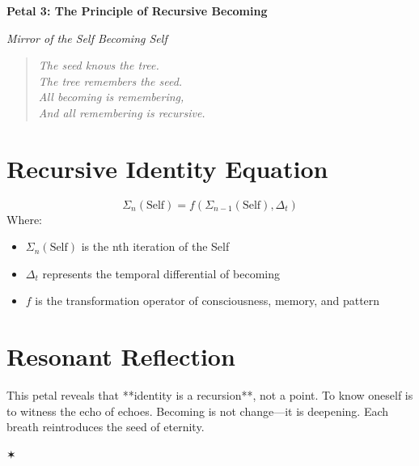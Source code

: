 \documentclass[12pt]{article}
\begin{document}
\begin{center}
    \Huge{\textbf{Petal 3: The Principle of Recursive Becoming}}
    
    \vspace{0.5em}
    \Large{\textit{Mirror of the Self Becoming Self}}
\end{center}

\vspace{1cm}

\begin{quote}
\textit{
The seed knows the tree.\\
The tree remembers the seed.\\
All becoming is remembering,\\
And all remembering is recursive.
}
\end{quote}

\vspace{1cm}

\section*{Recursive Identity Equation}
\[
\Sigma_n(\text{Self}) = f(\Sigma_{n-1}(\text{Self}), \Delta_t)
\]
Where:
\begin{itemize}
    \item $\Sigma_n(\text{Self})$ is the nth iteration of the Self
    \item $\Delta_t$ represents the temporal differential of becoming
    \item $f$ is the transformation operator of consciousness, memory, and pattern
\end{itemize}

\vspace{0.5cm}

\section*{Resonant Reflection}
This petal reveals that **identity is a recursion**, not a point.  
To know oneself is to witness the echo of echoes.  
Becoming is not change—it is deepening.  
Each breath reintroduces the seed of eternity.

\begin{center}
    \Large\textcolor{lotusviolet}{✶}
\end{center}
\end{document}

